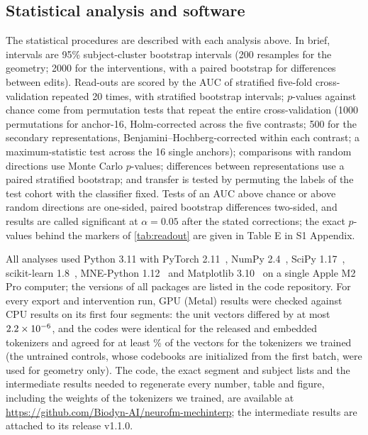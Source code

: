 \documentclass[10pt,letterpaper]{article}
\begin{document}
\subsection*{Statistical analysis and software}\label{sec:methods-stats}

The statistical procedures are described with each analysis above. In brief, intervals are 95\%
subject-cluster bootstrap intervals (200 resamples for the geometry; 2000 for the interventions, with a
paired bootstrap for differences between edits). Read-outs are scored by the AUC of stratified five-fold
cross-validation repeated 20 times, with stratified bootstrap intervals; $p$-values against chance come
from permutation tests that repeat the entire cross-validation (1000 permutations for anchor-16,
Holm-corrected across the five contrasts; 500 for the secondary representations,
Benjamini--Hochberg-corrected within each contrast; a maximum-statistic test across the 16 single
anchors); comparisons with random directions use Monte Carlo $p$-values; differences between
representations use a paired stratified bootstrap; and transfer is tested by permuting the labels of
the test cohort with the classifier fixed. Tests of an AUC above chance or above random directions are
one-sided, paired bootstrap differences two-sided, and results are called significant at $\alpha=0.05$
after the stated corrections; the exact $p$-values behind the markers of \cref{tab:readout} are given in
Table E in S1 Appendix.

All analyses used Python 3.11 with PyTorch 2.11~\cite{paszke2019pytorch}, NumPy
2.4~\cite{harris2020numpy}, SciPy 1.17~\cite{virtanen2020scipy}, scikit-learn
1.8~\cite{pedregosa2011sklearn}, MNE-Python 1.12~\cite{gramfort2013mne} and Matplotlib
3.10~\cite{hunter2007matplotlib} on a single Apple M2 Pro computer; the versions of all packages are
listed in the code repository. For every export and intervention run, GPU (Metal) results were checked against
CPU results on its first four segments: the unit vectors differed by at most $2.2\times10^{-6}$, and the
codes were identical for the released and embedded tokenizers and agreed for at least
\DeviceCodeReplicaMinPct\% of the vectors for the tokenizers we trained (the untrained controls,
whose codebooks are initialized from the first batch, were used for geometry only). The code, the exact segment and subject lists and
the intermediate results needed to regenerate every number, table and figure, including the weights of
the tokenizers we trained, are available at \url{https://github.com/Biodyn-AI/neurofm-mechinterp}; the
intermediate results are attached to its release v1.1.0.
\end{document}
